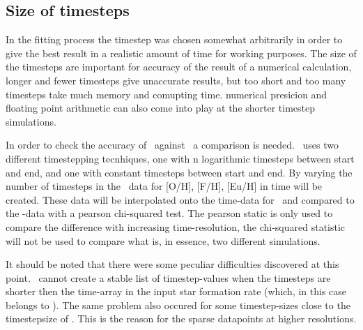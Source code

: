 \subsection{Size of timesteps}
In the fitting process the timestep was chosen somewhat arbitrarily in order to give the best result in a realistic amount of time for working purposes. The size of the timesteps are important for accuracy of the result of a numerical calculation, longer and fewer timesteps give unaccurate results, but too short and too many timesteps take much memory and comupting time. numerical presicion and floating point arithmetic can also come into play at the shorter timestep simulations.

In order to check the accuracy of \omegamodel\ against \eris\ a comparison is needed.
\omegamodel\ uses two different timestepping tecnhiques, one with n logarithmic timesteps between start and end, and one with constant timesteps between start and end.
By varying the number of timesteps in the \omegamodel\ data for [O/H], [F/H], [Eu/H] in time will be created.
These data will be interpolated onto the time-data for \eris\ and compared to the \eris-data with a pearson chi-squared test. The pearson static is only used to compare the difference with increasing time-resolution, the chi-squared statistic will not be used to compare what is, in essence, two different simulations.

It should be noted that there were some peculiar difficulties discovered at this point. \omegamodel\ cannot create a stable list of timestep-values when the timesteps are shorter then the time-array in the input star formation rate (which, in this case belongs to \eris). The same problem also occured for some timestep-sizes close to the timestepsize of \eris.
This is the reason for the sparse datapoints at higher resolutions.

